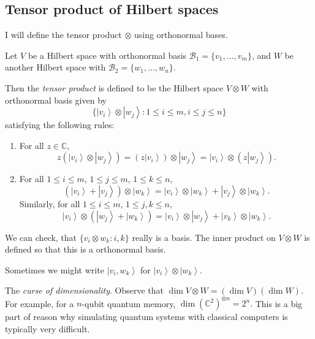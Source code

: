 \documentclass{article}
\begin{document}
\subsection{Tensor product of Hilbert spaces}

I will define the tensor product $\otimes $ using orthonormal bases. 

Let $V$ be a Hilbert space with orthonormal basis $\mathcal{B}_1 = \{v_1, \ldots, v_m\} $, and $W$ be another Hilbert space with $\mathcal{B}_2 = \{w_1, \ldots, w_n\} $.

Then the \textit{tensor product} is defined to be the Hilbert space $V \otimes W$ with orthonormal basis given by
\[
	\{\left| v_i \right\rangle  \otimes \left| w_j \right\rangle : 1 \le  i \le m, i \le j \le  n\} 
\] 
satisfying the following rules:
\begin{enumerate}
	\item For all $z \in \mathbb{C}$, 
		\[
			z\left( \left| v_i \right\rangle  \otimes  \left| w_j \right\rangle  \right)  = \left( z \left| v_i \right\rangle  \right) \otimes  \left| w_j \right\rangle  = \left| v_i \right\rangle  \otimes  \left( z \left| w_j \right\rangle  \right) 
		.\] 
	\item For all $1 \le i \le m$, $1 \le  j \le m$, $1 \le  k \le  n$, 
		\[
			\left( \left| v_i \right\rangle  + \left| v_j \right\rangle  \right)  \otimes  \left| w_k \right\rangle  = 
			\left| v_i \right\rangle  \otimes  \left| w_k \right\rangle  + \left| v_j \right\rangle  \otimes  \left| w_k \right\rangle 
		.\] 
		Similarly, for all $1 \le  i \le m$, $1 \le  j, k \le n$,
		\[
			\left| v_i \right\rangle  \otimes  \left( \left| w_j \right\rangle  + \left| w_k \right\rangle  \right) 
			= \left| v_i \right\rangle  \otimes  \left| w_j \right\rangle  + \left| v_k \right\rangle  \otimes  \left| w_k \right\rangle 
		.\] 
\end{enumerate}
We can check, that $\{v_i \otimes  w_k: i, k\} $ really is a basis. The inner product on $V \otimes W$ is defined so that this is a orthonormal basis.

Sometimes we might write $\left| v_i, w_k \right\rangle $ for $\left| v_i \right\rangle  \otimes \left| w_k \right\rangle $.

The \emph{curse of dimensionality}. Observe that $\operatorname{dim} V \otimes W = \left( \operatorname{dim} V \right)  \left( \operatorname{dim} W \right) .$ 
For example, for a $n$-qubit quantum memory, $\operatorname{dim} \left( \mathbb{C}^2 \right) ^{\otimes  n} = 2^n .$ This is a big part of reason why simulating quantum systems with classical computers is typically very difficult.
\end{document}
